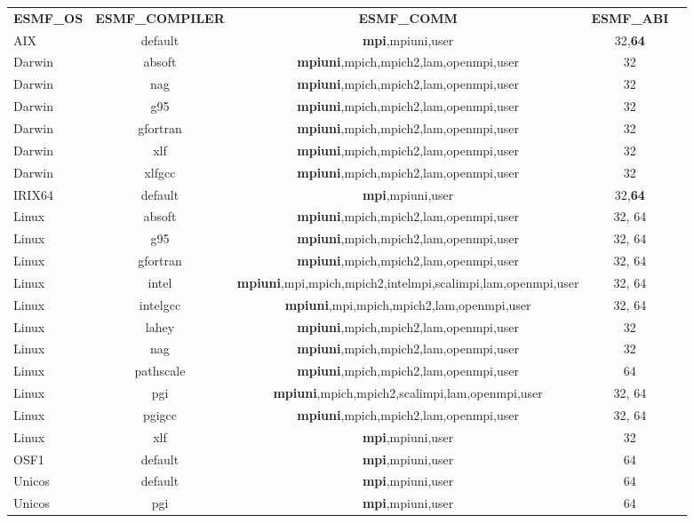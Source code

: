 \begin{tabular}{lcccc}
  {\bfseries ESMF\_OS} &{\bfseries ESMF\_COMPILER} & {\bfseries ESMF\_COMM} & {\bfseries ESMF\_ABI} \\

AIX     &  default      &  {\bf mpi},mpiuni,user         &  32,{\bf 64}  \\
Darwin  &  absoft       &  {\bf mpiuni},mpich,mpich2,lam,openmpi,user  &  32  \\
Darwin  &  nag          &  {\bf mpiuni},mpich,mpich2,lam,openmpi,user  &  32  \\
Darwin  &  g95          &  {\bf mpiuni},mpich,mpich2,lam,openmpi,user  &  32  \\
Darwin  &  gfortran     &  {\bf mpiuni},mpich,mpich2,lam,openmpi,user  &  32  \\
Darwin  &  xlf          &  {\bf mpiuni},mpich,mpich2,lam,openmpi,user  &  32  \\
Darwin  &  xlfgcc       &  {\bf mpiuni},mpich,mpich2,lam,openmpi,user  &  32  \\
IRIX64  &  default      &  {\bf mpi},mpiuni,user         &  32,{\bf 64}  \\
Linux   &  absoft       &  {\bf mpiuni},mpich,mpich2,lam,openmpi,user  &  32, 64 \\
Linux   &  g95          &  {\bf mpiuni},mpich,mpich2,lam,openmpi,user  &  32, 64 \\
Linux   &  gfortran     &  {\bf mpiuni},mpich,mpich2,lam,openmpi,user  &  32, 64 \\
Linux   &  intel        &  {\bf mpiuni},mpi,mpich,mpich2,intelmpi,scalimpi,lam,openmpi,user  &  32, 64 \\
Linux   &  intelgcc     &  {\bf mpiuni},mpi,mpich,mpich2,lam,openmpi,user  &  32, 64 \\
Linux   &  lahey        &  {\bf mpiuni},mpich,mpich2,lam,openmpi,user  &  32  \\
Linux   &  nag          &  {\bf mpiuni},mpich,mpich2,lam,openmpi,user  &  32  \\
Linux   &  pathscale    &  {\bf mpiuni},mpich,mpich2,lam,openmpi,user  &  64  \\
Linux   &  pgi          &  {\bf mpiuni},mpich,mpich2,scalimpi,lam,openmpi,user  &  32, 64  \\
Linux   &  pgigcc       &  {\bf mpiuni},mpich,mpich2,lam,openmpi,user  &  32, 64  \\
Linux   &  xlf          &  {\bf mpi},mpiuni,user         &  32  \\
OSF1    &  default      &  {\bf mpi},mpiuni,user         &  64  \\
Unicos  &  default      &  {\bf mpi},mpiuni,user         &  64  \\
Unicos  &  pgi          &  {\bf mpi},mpiuni,user         &  64

\end{tabular}

\vspace{1ex}

